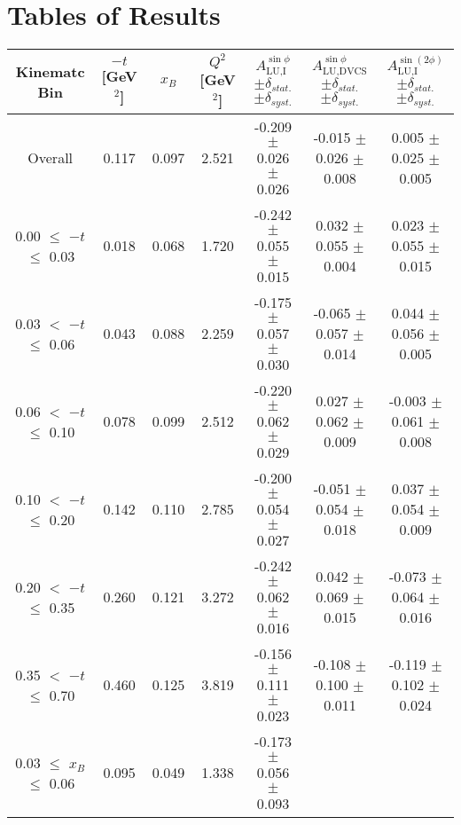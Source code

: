 \appendix
\setcounter{equation}{0}

\section{Tables of Results}


\begin{table}[width=15cm]
 \begin{center}
\resizebox{16cm}{!} {
  \begin{tabular}{|c|c|c|c|c|c|c|}
\hline
Kinematc Bin &  $-t$ [GeV$^{2}$] & $x_{B}$ & $Q^{2}$ [GeV$^{2}$] & 
$A_{\textrm{LU,I}}^{\sin\phi}$ $\pm \delta_{stat.}$ $\pm \delta_{syst.}$ & $A_{\textrm{LU,DVCS}}^{\sin\phi}$ $\pm \delta_{stat.}$ $\pm \delta_{syst.}$
& $A_{\textrm{LU,I}}^{\sin(2\phi)}$ $\pm \delta_{stat.}$ $\pm \delta_{syst.}$ \\
\hline
\hline
Overall &  0.117 & 0.097 &  2.521 &  -0.209  $\pm$  0.026  $\pm$   0.026 &
 -0.015  $\pm$  0.026  $\pm$  0.008 & 0.005  $\pm$  0.025  $\pm$   0.005 \\
\hline
0.00 $\leqslant$ $-t$ $\leqslant$ 0.03 &  0.018 & 0.068 &  1.720 &  -0.242  $\pm$  0.055  $\pm$   0.015 &
 0.032  $\pm$  0.055   $\pm$  0.004 & 0.023  $\pm$  0.055  $\pm$   0.015\\
0.03 $<$ $-t$ $\leqslant$ 0.06 &  0.043 & 0.088 &  2.259&  -0.175 $\pm$   0.057   $\pm$  0.030 &
 -0.065 $\pm$   0.057  $\pm$   0.014 & 0.044  $\pm$  0.056  $\pm$   0.005\\
0.06 $<$ $-t$ $\leqslant$ 0.10 &  0.078 & 0.099 &  2.512 & -0.220 $\pm$   0.062   $\pm$  0.029 &
 0.027  $\pm$  0.062  $\pm$   0.009 & -0.003  $\pm$  0.061   $\pm$  0.008 \\
0.10 $<$ $-t$ $\leqslant$ 0.20 &  0.142 & 0.110 &  2.785 &  -0.200 $\pm$   0.054  $\pm$   0.027 &
-0.051  $\pm$  0.054  $\pm$   0.018 & 0.037  $\pm$  0.054  $\pm$  0.009\\
0.20 $<$ $-t$ $\leqslant$ 0.35 &  0.260 & 0.121 &  3.272 &  -0.242 $\pm$   0.062  $\pm$   0.016 &
0.042  $\pm$  0.069  $\pm$   0.015 & -0.073 $\pm$   0.064   $\pm$  0.016\\
0.35 $<$ $-t$ $\leqslant$ 0.70 &  0.460 & 0.125 &  3.819 &  -0.156  $\pm$  0.111  $\pm$   0.023 & 
-0.108  $\pm$  0.100   $\pm$  0.011 & -0.119 $\pm$   0.102  $\pm$   0.024\\
\hline
0.03 $\leqslant$ $x_{B}$ $\leqslant$ 0.06 &  0.095 & 0.049 &  1.338 &  -0.173  $\pm$  0.056  $\pm$   0.093 &

\end{tabular}}
\end{center}
\end{table}
